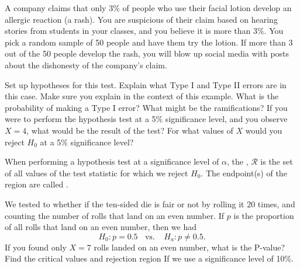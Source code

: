 \pagestyle{fancy}
\renewcommand{\theUnit}{8}
\ifthenelse{\isundefined{\UnitPageNumbers}}{}{\setcounter{page}{1}}
\rhead{Chapter  \theUnit: Hypothesis Tests}
\rfoot{\mypage}
\renewcommand{\footrulewidth}{.4pt}
\vspace*{-20pt} \thispagestyle{firstfooter}



\bb
\ii A company claims that only 3\% of people who use their facial lotion develop an allergic reaction (a rash). You are suspicious of their claim based on hearing stories from students in your classes, and you believe it is more than 3\%. You pick a random sample of 50 people and have them try the lotion. If more than 3 out of the 50 people develop the rash, you will blow up social media with posts about the dishonesty of the company's claim.

\bb
\ii Set up hypotheses for this test. \vspace{0.6in}
\ii Explain what  Type I and Type II errors are in this case. Make sure you explain in the context of this example. \vspace{1in}
\ii What is the probability of making a Type I error? What might be the ramifications? \vfill
\ii If you were to perform the hypothesis test at a 5\% significance level, and you observe $X=4$, what would be the result of the test? \vfill
\ii For what values of $X$ would you reject $H_0$ at a 5\% significance level? \vfill
\ee
\ee

\clearpage



\bbox
When performing a hypothesis test at a significance level of $\alpha$, the \textbf{}, $\mathcal{R}$ is the set of all values of the test statistic for which we reject $H_0$. The endpoint(s) of the region are called \textbf{}.
\ebox

\bb[resume]
\ii We tested to whether if the ten-sided die is fair or not by rolling it 20 times, and counting the number of rolls that land on an even number. If $p$ is the proportion of all rolls that land on an even number, then we had
\[ H_0: p = 0.5 \ \ \ \ \mbox{vs.} \ \ \ \ \ H_a: p \ne 0.5. \]
\bb
\ii If you found only $X=7$ rolls landed on an even number, what is the P-value? \vspace{3in}
\ii Find the critical values and rejection region If we use a significance level of 10\%.
\ee


